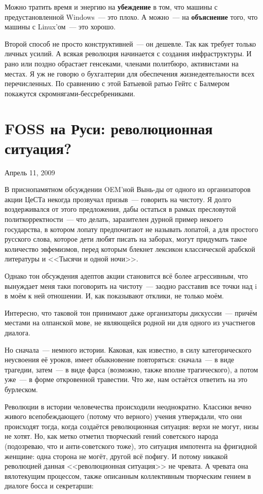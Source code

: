 Можно тратить время и энергию на \textbf{убеждение} в том, что машины с предустановленной Windows~--- это плохо. А можно~--- на \textbf{объяснение} того, что машины с Linux'ом~--- это хорошо.

Второй способ не просто конструктивней~--- он дешевле. Так как требует только личных усилий. А всякая революция начинается с создания инфраструктуры. И рано или поздно обрастает генсеками, членами политбюро, активистами на местах. Я уж не говорю о бухгалтерии для обеспечения жизнедеятельности всех перечисленных. По сравнению с этой Батыевой ратью Гейтс с Балмером покажутся скромнягами-бессребрениками.

\section{FOSS на Руси: революционная ситуация?} 

\begin{timeline}Апрель 11, 2009\end{timeline}

В приснопамятном обсуждении OEM'ной Вынь-ды от одного из организаторов акции ЦеСТа некогда прозвучал призыв~--- говорить на чистоту. Я долго воздерживался от этого предложения, дабы остаться в рамках пресловутой политкорректности~--- что делать, заразителен дурной пример некоего государства, в котором лопату предпочитают не называть лопатой, а для простого русского слова, которое дети любят писать на заборах, могут придумать такое количество эвфемизмов, перед которым блекнет лексикон классической арабской литературы и <<Тысячи и одной ночи>>.

Однако тон обсуждения адептов акции становится всё более агрессивным, что вынуждает меня таки поговорить на чистоту~--- заодно расставив все точки над i в моём к ней отношении. И, как показывают отклики, не только моём.

Интересно, что таковой тон принимают даже организаторы дискуссии~--- причём местами на олпанской мове, не являющейся родной ни для одного из участнегов диалога.

Но сначала~--- немного истории. Каковая, как известно, в силу категорического неусвоения её уроков, имеет обыкновение повторяться: сначала~--- в виде трагедии, затем~--- в виде фарса (возможно, также вполне трагического), а потом уже~--- в форме откровенной травестии. Что же, нам остаётся ответить на это бурлеском.

Революции в истории человечества происходили неоднократно. Классики вечно живого всепобеждающего (потому что верного) учения утверждали, что они происходят тогда, когда создаётся революционная ситуация: верхи не могут, низы не хотят. Но, как метко отметил творческий гений советского народа (подозреваю, что и анти-советского тоже), это ситуация импотента на фригидной женщине: одна сторона не могёт, другой всё пофигу. И потому никакой революцией данная <<революционная ситуация>> не чревата. А чревата она вялотекущим процессом, также описанным коллективным творческим гением в диалоге босса и секретарши:

